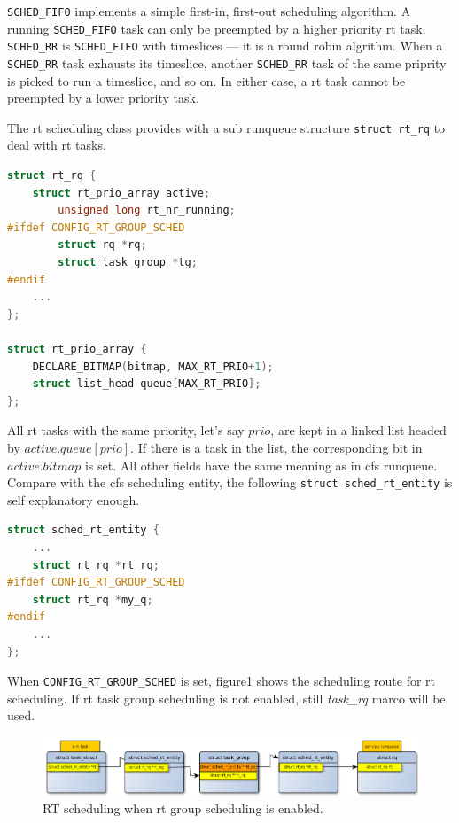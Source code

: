 \texttt{SCHED\_FIFO} implements a simple first-in, first-out scheduling 
algorithm. A running \texttt{SCHED\_FIFO} task can only be preempted by a 
higher priority rt task. \texttt{SCHED\_RR} is \texttt{SCHED\_FIFO} with 
timeslices --- it is a round robin algrithm. When a \texttt{SCHED\_RR}
task exhausts its timeslice, another \texttt{SCHED\_RR} task of the same
priprity is picked to run a timeslice, and so on. In either case, a rt task
cannot be preempted by a lower priority task.

The rt scheduling class provides with a sub runqueue structure 
\texttt{struct rt\_rq} to deal with rt tasks.
\begin{lstlisting}[language=C,
		caption={\texttt{The rt runqueue}},
		label={rtrunqueue}]
struct rt_rq {
	struct rt_prio_array active;
        unsigned long rt_nr_running;
#ifdef CONFIG_RT_GROUP_SCHED
        struct rq *rq;
        struct task_group *tg;
#endif
	...
};

struct rt_prio_array {
	DECLARE_BITMAP(bitmap, MAX_RT_PRIO+1); 
	struct list_head queue[MAX_RT_PRIO];
};
\end{lstlisting}
All rt tasks with the same priority, let's say $prio$, are kept in a linked 
list headed by $active.queue[prio]$. If there is a task in the list, the 
corresponding bit in $active.bitmap$ is set. All other fields have the same
meaning as in cfs runqueue. Compare with the cfs scheduling entity, the 
following \texttt{struct sched\_rt\_entity} is self explanatory enough. 
\begin{lstlisting}[language=C,
		caption={\texttt{The rt scheduling entity}},
		label={rt_entity}]
struct sched_rt_entity {
	...
	struct rt_rq *rt_rq;
#ifdef CONFIG_RT_GROUP_SCHED
	struct rt_rq *my_q;
#endif
	...
}; 
\end{lstlisting}

When \texttt{CONFIG\_RT\_GROUP\_SCHED} is set, figure\ref{fig:rt_scheme_tg} 
shows the scheduling route for rt scheduling. If rt task group scheduling is 
not enabled, still \emph{task\_rq} marco will be used.
\begin{figure}[htbp]
        \centering
        \includegraphics[width=\textwidth]{images/rt_scheduling_scheme_tg}
        \caption{RT scheduling when rt group scheduling is enabled.}
        \label{fig:rt_scheme_tg}
\end{figure}

